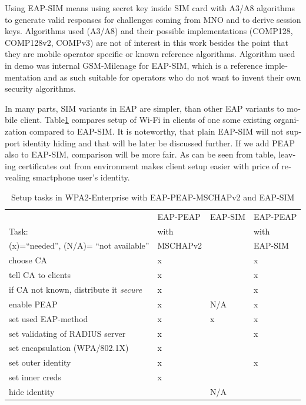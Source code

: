 \documentclass[12pt,a4paper,english]{tutthesis}
\begin{document}
\begin{otherlanguage}{english}
  Using EAP-SIM means using secret key inside SIM card with A3/A8
algorithms to generate valid responses for challenges coming from MNO
and to derive session keys.  Algorithms used (A3/A8) and their
possible implementations (COMP128, COMP128v2, COMPv3) are not of
interest in this work besides the point that they are mobile operator
specific or known reference algorithms.
Algorithm used in demo was internal GSM-Milenage for EAP-SIM,
which is a reference implementation and as such suitable for  operators who do not 
want to invent their own security algorithms. 


In many parts, SIM variants in EAP are simpler, than other EAP
variants to mobile client.  Table\ref{table-peapsim} compares setup of Wi-Fi
in clients of one some existing organization compared to EAP-SIM. It
is noteworthy, that plain EAP-SIM will not support identity hiding and
that will be later be discussed further. If we add PEAP\cite{peap}
also to EAP-SIM, comparison will be more fair.
As can be seen from table, leaving certificates out from environment
makes client setup easier with price of revealing smartphone user's
identity.  



\begin{table}[htb]
\caption{\label{table-peapsim}Setup tasks in  WPA2-Enterprise with EAP-PEAP-MSCHAPv2 and EAP-SIM}
\centering
\begin{tabular}{llll}
 & EAP-PEAP & EAP-SIM & EAP-PEAP\\
Task: & with &  & with\\
(x)=``needed'', (N/A)= ``not available'' & MSCHAPv2 &  & EAP-SIM\\
\hline
choose CA & x &  & x\\
tell CA to clients & x &  & x\\
if CA not known, distribute it \emph{secure} & x &  & x\\
enable PEAP & x & N/A & x\\
set used EAP-method & x & x & x\\
set validating of RADIUS server & x &  & x\\
set encapsulation (WPA/802.1X) & x &  & \\
set outer identity & x &  & x\\
set inner creds & x &  & \\
hide identity &  & N/A & \\
\hline
\end{tabular}
\end{table}






\end{otherlanguage}
\end{document}
